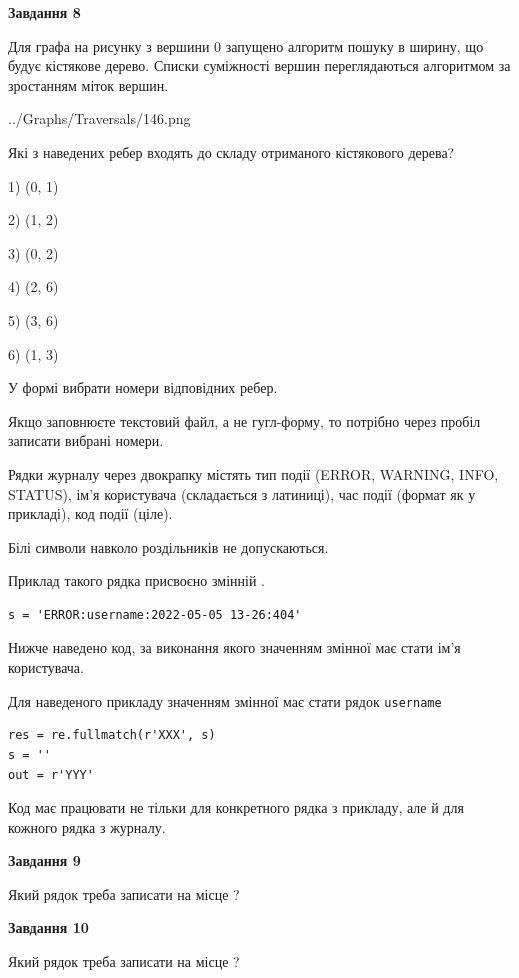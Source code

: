 \documentclass[12pt, ukrainian]{article}
\def\code#1{\Verb!#1!}
\begin{document}
{\begin {large}
{\begin {center}\textbf{Завдання 8}\end {center}}\par
Для графа на рисунку з вершини 0 запущено алгоритм пошуку в ширину, що будує кістякове дерево. Списки суміжності вершин переглядаються алгоритмом за зростанням міток вершин.\par
\begin{center}
	{../Graphs/Traversals/146.png}
\end{center}
\par Які з наведених ребер входять до складу отриманого кістякового дерева?\par
1) (0, 1)\par
2) (1, 2)\par
3) (0, 2)\par
4) (2, 6)\par
5) (3, 6)\par
6) (1, 3)\par
{\vskip 15pt} У формі вибрати номери відповідних ребер.


Якщо заповнюєте текстовий файл, а не гугл-форму, то потрібно через пробіл записа\-ти вибрані номери.\par
\newpage


Рядки журналу через двокрапку містять тип події (ERROR, WARNING, INFO, STATUS), ім'я користувача (складається з латиниці), час події (фор\-мат як у прикладі), код події (ціле).

Білі символи навколо роздільників не допускаються.

Приклад такого рядка присвоєно змінній .



\begin{verbatim}
s = 'ERROR:username:2022-05-05 13-26:404'
\end{verbatim}


Нижче наведено код, за виконання якого значенням змінної  має стати ім'я користувача.

Для наведеного прикладу значенням змінної  має стати рядок \code{username}



\begin{verbatim}
res = re.fullmatch(r'XXX', s)
s = ''
out = r'YYY'
\end{verbatim}


Код має працювати не тільки для конкретного рядка з прикладу, але й для кожного рядка з журналу.

{\begin {center}\textbf{Завдання 9}\end {center}}\par
Який рядок треба записати на місце  ?\par
\vspace{5mm}


{\begin {center}\textbf{Завдання 10}\end {center}}\par
Який рядок треба записати на місце  ?\par


\newpage


\end {large}}
\end{document}
